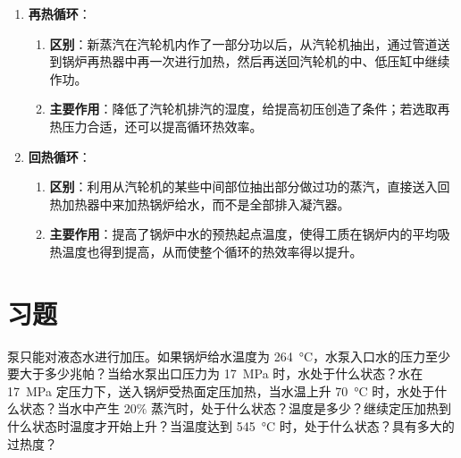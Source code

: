 \begin{solution}
\begin{enumerate}
  \item \textbf{再热循环}：
  \begin{enumerate}
    \item \textbf{区别}：新蒸汽在汽轮机内作了一部分功以后，从汽轮机抽出，通过管道送到锅炉再热器中再一次进行加热，然后再送回汽轮机的中、低压缸中继续作功。
    \item \textbf{主要作用}：降低了汽轮机排汽的湿度，给提高初压创造了条件；若选取再热压力合适，还可以提高循环热效率。
  \end{enumerate}
  \item \textbf{回热循环}：
  \begin{enumerate}
    \item \textbf{区别}：利用从汽轮机的某些中间部位抽出部分做过功的蒸汽，直接送入回热加热器中来加热锅炉给水，而不是全部排入凝汽器。
    \item \textbf{主要作用}：提高了锅炉中水的预热起点温度，使得工质在锅炉内的平均吸热温度也得到提高，从而使整个循环的热效率得以提升。
  \end{enumerate}
\end{enumerate}
\end{solution}

\section{习题}

\begin{problem}
泵只能对液态水进行加压。如果锅炉给水温度为 \qty{264}{\degreeCelsius}，水泵入口水的压力至少要大于多少兆帕？当给水泵出口压力为 \qty{17}{MPa} 时，水处于什么状态？水在 \qty{17}{MPa} 定压力下，送入锅炉受热面定压加热，当水温上升 \qty{70}{\degreeCelsius} 时，水处于什么状态？当水中产生 \(20\%\) 蒸汽时，处于什么状态？温度是多少？继续定压加热到什么状态时温度才开始上升？当温度达到 \qty{545}{\degreeCelsius} 时，处于什么状态？具有多大的过热度？
\end{problem}

